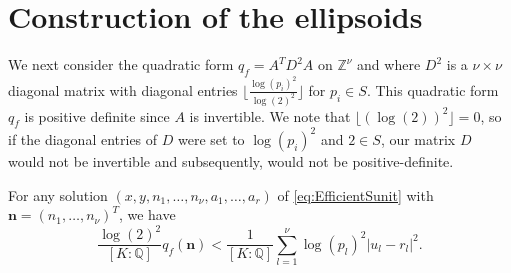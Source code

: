 \section{Construction of the ellipsoids}

We next consider the quadratic form $q_f=A^TD^2A$ on $\mathbb{Z}^{\nu}$ and where $D^2$ is a $\nu \times \nu$ diagonal matrix with diagonal entries $\lfloor\frac{\log(p_i)^2}{\log(2)^2}\rfloor$ for $p_i \in S$. This quadratic form $q_f$ is positive definite since $A$ is invertible. We note that $\lfloor(\log(2))^2\rfloor = 0$, so if the diagonal entries of $D$ were set to $\log(p_i)^2$ and $2\in S$, our matrix $D$ would not be invertible and subsequently, would not be positive-definite. 

\begin{lemma}
For any solution $(x,y, n_1, \dots, n_{\nu}, a_1, \dots, a_r)$ of \eqref{eq:EfficientSunit} with $\mathbf{n} = (n_1, \dots, n_{\nu})^T$, we have 
\[\frac{\log(2)^2}{[K:\mathbb{Q}]}q_f(\mathbf{n}) < \frac{1}{[K:\mathbb{Q}]}\sum_{l = 1}^{\nu}\log(p_l)^2|u_l -r_l|^2.\] 
\end{lemma}

